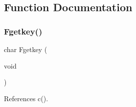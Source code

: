 \subsection{Function Documentation}
\mbox{\label{C-M__getkey_8c_a257d1f3a5480d15d83e0bf1d43647afc}} 
\subsubsection{\texorpdfstring{Fgetkey()}{Fgetkey()}}
{\footnotesize\ttfamily char Fgetkey (\begin{DoxyParamCaption}\item[{void}]{ }\end{DoxyParamCaption})}



References c().

